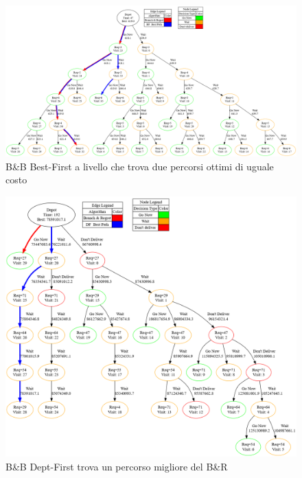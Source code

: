 \documentclass[
    article,            %
    12pt,                %
    oneside,            %
    a4paper,            %
    english,            %
    italian,                %
    sumario=tradicional,
]{abntex2}
\begin{document}
\vspace*{\fill}
\newpage{}
\vspace*{\fill}
\begin{figure}[h!]
    \centering
    \includegraphics[width=1.0\textwidth]{Images/raro.png}
    \caption{B\&B Best-First a livello che trova due percorsi ottimi di uguale costo}
    \label{fig:BBBFduepath}
\end{figure}
\vspace*{\fill}
\newpage{}
\vspace*{\fill}
\begin{figure}[h!]
    \centering
    \includegraphics[width=1.0\textwidth]{Images/good_shit.png}
    \caption{B\&B Dept-First trova un percorso migliore del B\&R}
    \label{fig:BBDFmigliore}
\end{figure}
\vspace*{\fill}
\end{document}

